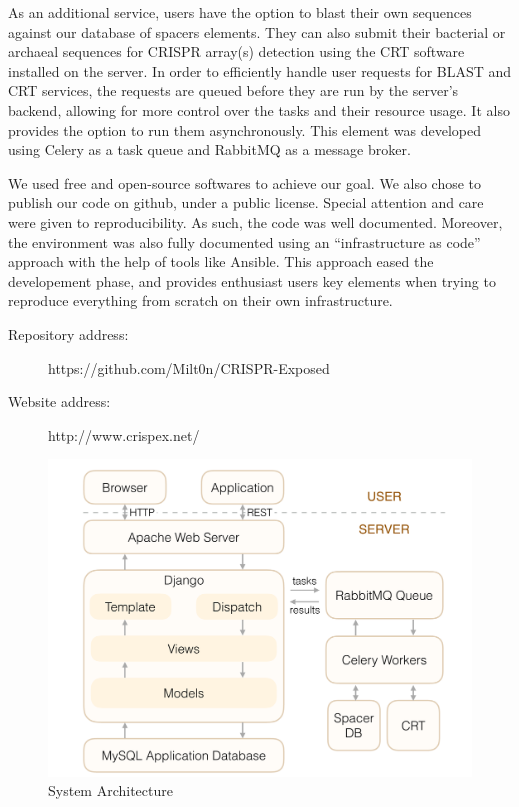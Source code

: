 \documentclass[11pt, a4paper,titlepage]{article}
\begin{document}
As an additional service, users have the option to blast their own
sequences against our database of spacers elements. They can also
submit their bacterial or archaeal sequences for CRISPR array(s)
detection using the CRT software installed on the server. In order to
efficiently handle user requests for BLAST and CRT services, the
requests are queued before they are run by the server's backend,
allowing for more control over the tasks and their resource usage. It
also provides the option to run them asynchronously. This element was
developed using Celery as a task queue and RabbitMQ as a message
broker.

We used free and open-source softwares to achieve our goal. We also
chose to publish our code on github, under a public license. Special
attention and care were given to reproducibility. As such, the code
was well documented. Moreover, the environment was also fully
documented using an “infrastructure as code” approach with the help of
tools like Ansible. This approach eased the developement phase, and
provides enthusiast users key elements when trying to reproduce
everything from scratch on their own infrastructure.

\begin{description}
  \item[Repository address: ] https://github.com/Milt0n/CRISPR-Exposed
  \item[Website address: ] http://www.crispex.net/
\end{description}

\begin{figure}
  \centering
  \includegraphics[scale=0.3]{figures/soft_arch.pdf}
  \caption{System Architecture}
\end{figure}
\end{document}
